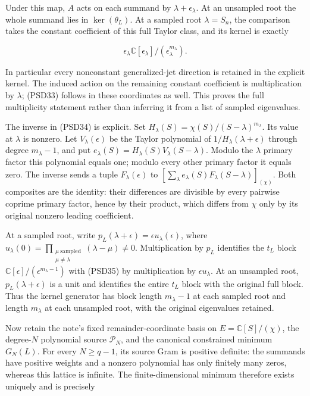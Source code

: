 Under this map, \(A\) acts on each summand by \(\lambda+\epsilon_\lambda\). At an unsampled root the whole summand lies in \(\ker(\theta_L)\). At a sampled root \(\lambda=S_n\), the comparison takes the constant coefficient of this full Taylor class, and its kernel is exactly

\[
\epsilon_\lambda\mathbb C[\epsilon_\lambda]/(\epsilon_\lambda^{m_\lambda}).
\tag{PSD35}
\]

In particular every nonconstant generalized-jet direction is retained in the explicit kernel. The induced action on the remaining constant coefficient is multiplication by \(\lambda\); (PSD33) follows in these coordinates as well. This proves the full multiplicity statement rather than inferring it from a list of sampled eigenvalues.

The inverse in (PSD34) is explicit. Set \(H_\lambda(S)=\chi(S)/(S-\lambda)^{m_\lambda}\). Its value at \(\lambda\) is nonzero. Let \(V_\lambda(\epsilon)\) be the Taylor polynomial of \(1/H_\lambda(\lambda+\epsilon)\) through degree \(m_\lambda-1\), and put \(e_\lambda(S)=H_\lambda(S)V_\lambda(S-\lambda)\). Modulo the \(\lambda\) primary factor this polynomial equals one; modulo every other primary factor it equals zero. The inverse sends a tuple \(F_\lambda(\epsilon)\) to \(\left[\sum_\lambda e_\lambda(S)F_\lambda(S-\lambda)\right]_{(\chi)}\). Both composites are the identity: their differences are divisible by every pairwise coprime primary factor, hence by their product, which differs from \(\chi\) only by its original nonzero leading coefficient.

At a sampled root, write \(p_L(\lambda+\epsilon)=\epsilon u_\lambda(\epsilon)\), where \(u_\lambda(0)=\prod_{\substack{\mu\ \mathrm{sampled}\\\mu\ne\lambda}}(\lambda-\mu)\ne0\). Multiplication by \(p_L\) identifies the \(t_L\) block \(\mathbb C[\epsilon]/(\epsilon^{m_\lambda-1})\) with (PSD35) by multiplication by \(\epsilon u_\lambda\). At an unsampled root, \(p_L(\lambda+\epsilon)\) is a unit and identifies the entire \(t_L\) block with the original full block. Thus the kernel generator has block length \(m_\lambda-1\) at each sampled root and length \(m_\lambda\) at each unsampled root, with the original eigenvalues retained.

Now retain the note's fixed remainder-coordinate basis on \(E=\mathbb C[S]/(\chi)\), the degree-\(N\) polynomial source \(\mathcal P_N\), and the canonical constrained minimum \(G_N(L)\). For every \(N\ge q-1\), its source Gram is positive definite: the summands have positive weights and a nonzero polynomial has only finitely many zeros, whereas this lattice is infinite. The finite-dimensional minimum therefore exists uniquely and is precisely

